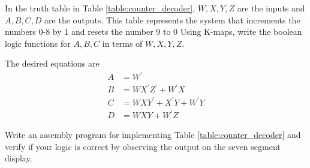 \begin{problem}
	\label{counter_dec}
	In the  truth table in Table \ref{table:counter_decoder},  $W,X,Y,Z$ are the inputs
and $A,B,C,D$ are the outputs. This table represents the system that increments the numbers 0-8 by 1 and resets the number 9 to 0
%
Using K-maps, write the boolean logic functions for $A,B,C$ in terms of $W,X,Y,Z$.
\end{problem}
%
\solution The desired equations are
%
\begin{align}
A &= W^{\prime}
\\
B &= WX^{\prime} Z^{\prime} + W^{\prime}X
\\
C &= WXY^{\prime}+X^{\prime}Y + W^{\prime}Y
\\
D &= WXY + W^{\prime}Z
\end{align}
%
%
\begin{problem}
Write an assembly program for implementing Table \ref{table:counter_decoder} and verify if your logic is correct by observing the output on the seven segment display.
\end{problem}
